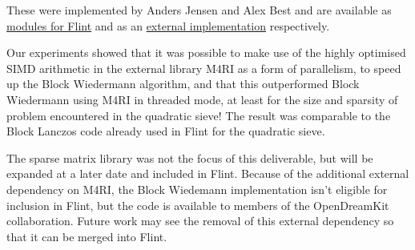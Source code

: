 These were implemented by Anders Jensen and Alex Best and are available
as
\href{https://github.com/alexjbest/flint2/tree/nmod_sparse_mat/nmod_sparse_mat}{modules
for Flint} and as an \href{https://github.com/alexjbest/bw}{external
implementation} respectively.

Our experiments showed that it was possible to make use of the highly
optimised SIMD arithmetic in the external library M4RI as a form of
parallelism, to speed up the Block Wiedermann algorithm, and that this
outperformed Block Wiedermann using M4RI in threaded mode, at least for
the size and sparsity of problem encountered in the quadratic sieve! The
result was comparable to the Block Lanczos code already used in Flint
for the quadratic sieve.

The sparse matrix library was not the focus of this deliverable, but
will be expanded at a later date and included in Flint. Because of the
additional external dependency on M4RI, the Block Wiedemann
implementation isn't eligible for inclusion in Flint, but the code is
available to members of the OpenDreamKit collaboration. Future work may
see the removal of this external dependency so that it can be merged
into Flint.
